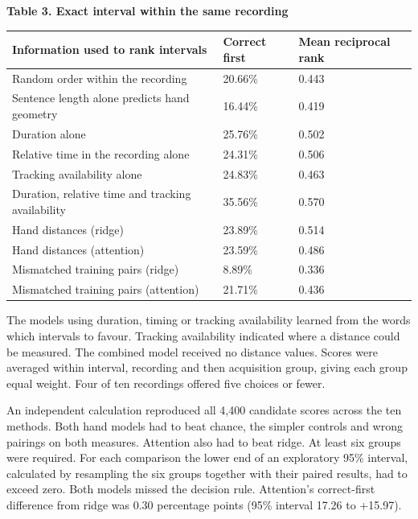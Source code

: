 \par\medskip\noindent\textbf{Table 3. Exact interval within the same recording}
\par\smallskip\noindent
\begin{tabular}{@{}p{.51\linewidth}p{.17\linewidth}p{.23\linewidth}@{}}
\textbf{Information used to rank intervals} & \textbf{Correct first} & \textbf{Mean reciprocal rank} \\
\hline
Random order within the recording & 20.66\% & 0.443 \\
Sentence length alone predicts hand geometry & 16.44\% & 0.419 \\
Duration alone & 25.76\% & 0.502 \\
Relative time in the recording alone & 24.31\% & 0.506 \\
Tracking availability alone & 24.83\% & 0.463 \\
Duration, relative time and tracking availability & 35.56\% & 0.570 \\
Hand distances (ridge) & 23.89\% & 0.514 \\
Hand distances (attention) & 23.59\% & 0.486 \\
Mismatched training pairs (ridge) & 8.89\% & 0.336 \\
Mismatched training pairs (attention) & 21.71\% & 0.436 \\
\end{tabular}\par\medskip

\noindent The models using duration, timing or tracking availability learned from the words which intervals to favour. Tracking availability indicated where a distance could be measured. The combined model received no distance values. Scores were averaged within interval, recording and then acquisition group, giving each group equal weight. Four of ten recordings offered five choices or fewer.\par

\noindent An independent calculation reproduced all 4,400 candidate scores across the ten methods. Both hand models had to beat chance, the simpler controls and wrong pairings on both measures. Attention also had to beat ridge. At least six groups were required. For each comparison the lower end of an exploratory 95\% interval, calculated by resampling the six groups together with their paired results, had to exceed zero. Both models missed the decision rule. Attention's correct-first difference from ridge was \textminus{}0.30 percentage points (95\% interval \textminus{}17.26 to +15.97).\par

